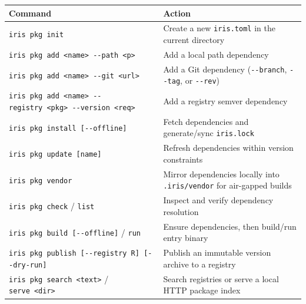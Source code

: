 \documentclass[
  english,
  oneside]{book}
\newcounter{none} %
\begin{document}
{\def\LTcaptype{none} %
\begin{longtable}[]{@{}
  >{\raggedright\arraybackslash}p{}
  >{\raggedright\arraybackslash}p{}@{}}
\toprule\noalign{}
\begin{minipage}[b]{\linewidth}\raggedright
Command
\end{minipage} & \begin{minipage}[b]{\linewidth}\raggedright
Action
\end{minipage} \\
\midrule\noalign{}
\endhead
\bottomrule\noalign{}
\endlastfoot
\texttt{iris\ pkg\ init} & Create a new \texttt{iris.toml} in the
current directory \\
\texttt{iris\ pkg\ add\ \textless{}name\textgreater{}\ -\/-path\ \textless{}p\textgreater{}}
& Add a local path dependency \\
\texttt{iris\ pkg\ add\ \textless{}name\textgreater{}\ -\/-git\ \textless{}url\textgreater{}}
& Add a Git dependency (\texttt{-\/-branch}, \texttt{-\/-tag}, or
\texttt{-\/-rev}) \\
\texttt{iris\ pkg\ add\ \textless{}name\textgreater{}\ -\/-registry\ \textless{}pkg\textgreater{}\ -\/-version\ \textless{}req\textgreater{}}
& Add a registry semver dependency \\
\texttt{iris\ pkg\ install\ {[}-\/-offline{]}} & Fetch dependencies and
generate/sync \texttt{iris.lock} \\
\texttt{iris\ pkg\ update\ {[}name{]}} & Refresh dependencies within
version constraints \\
\texttt{iris\ pkg\ vendor} & Mirror dependencies locally into
\texttt{.iris/vendor} for air-gapped builds \\
\texttt{iris\ pkg\ check} / \texttt{list} & Inspect and verify
dependency resolution \\
\texttt{iris\ pkg\ build\ {[}-\/-offline{]}} / \texttt{run} & Ensure
dependencies, then build/run entry binary \\
\texttt{iris\ pkg\ publish\ {[}-\/-registry\ R{]}\ {[}-\/-dry-run{]}} &
Publish an immutable version archive to a registry \\
\texttt{iris\ pkg\ search\ \textless{}text\textgreater{}} /
\texttt{serve\ \textless{}dir\textgreater{}} & Search registries or
serve a local HTTP package index \\
\end{longtable}
}
\end{document}
